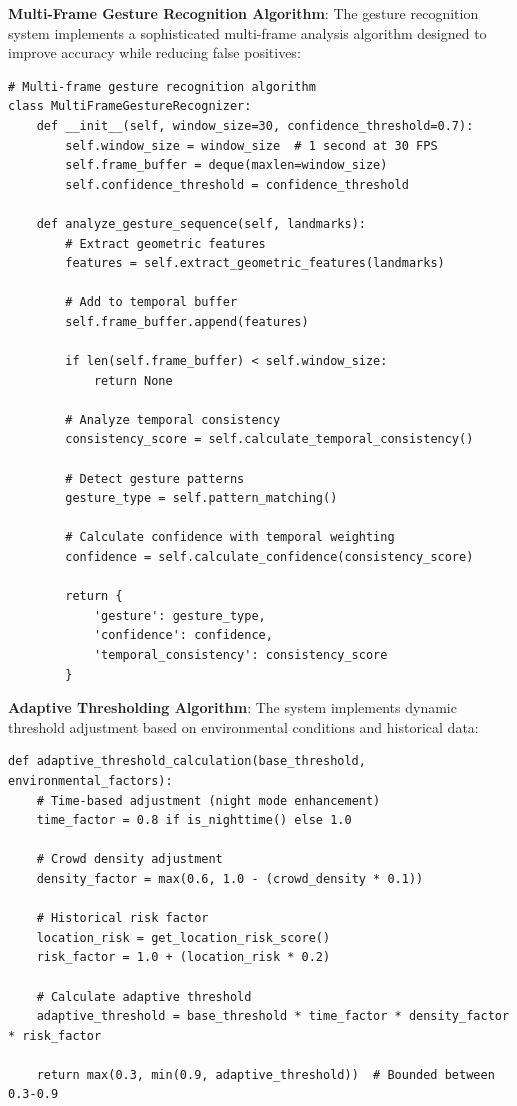 \documentclass[12pt,a4paper]{article}
\begin{document}
\textbf{Multi-Frame Gesture Recognition Algorithm}:
The gesture recognition system implements a sophisticated multi-frame analysis algorithm designed to improve accuracy while reducing false positives:

\begin{lstlisting}
# Multi-frame gesture recognition algorithm
class MultiFrameGestureRecognizer:
    def __init__(self, window_size=30, confidence_threshold=0.7):
        self.window_size = window_size  # 1 second at 30 FPS
        self.frame_buffer = deque(maxlen=window_size)
        self.confidence_threshold = confidence_threshold
        
    def analyze_gesture_sequence(self, landmarks):
        # Extract geometric features
        features = self.extract_geometric_features(landmarks)
        
        # Add to temporal buffer
        self.frame_buffer.append(features)
        
        if len(self.frame_buffer) < self.window_size:
            return None
            
        # Analyze temporal consistency
        consistency_score = self.calculate_temporal_consistency()
        
        # Detect gesture patterns
        gesture_type = self.pattern_matching()
        
        # Calculate confidence with temporal weighting
        confidence = self.calculate_confidence(consistency_score)
        
        return {
            'gesture': gesture_type,
            'confidence': confidence,
            'temporal_consistency': consistency_score
        }
\end{lstlisting}

\textbf{Adaptive Thresholding Algorithm}:
The system implements dynamic threshold adjustment based on environmental conditions and historical data:

\begin{lstlisting}
def adaptive_threshold_calculation(base_threshold, environmental_factors):
    # Time-based adjustment (night mode enhancement)
    time_factor = 0.8 if is_nighttime() else 1.0
    
    # Crowd density adjustment
    density_factor = max(0.6, 1.0 - (crowd_density * 0.1))
    
    # Historical risk factor
    location_risk = get_location_risk_score()
    risk_factor = 1.0 + (location_risk * 0.2)
    
    # Calculate adaptive threshold
    adaptive_threshold = base_threshold * time_factor * density_factor * risk_factor
    
    return max(0.3, min(0.9, adaptive_threshold))  # Bounded between 0.3-0.9
\end{lstlisting}
\end{document}
